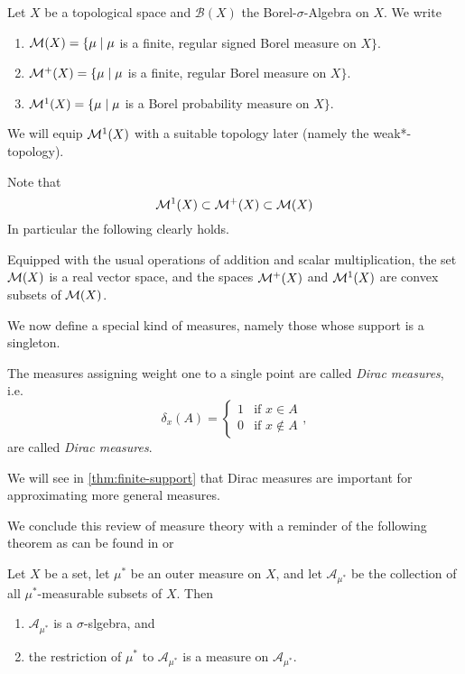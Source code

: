 \begin{notation}
	Let $X$ be a topological space and $\mathcal{B}(X)$ the Borel-$\sigma$-Algebra on $X$. We write
	\begin{enumerate}
	\item	$\mathcal{M}(X)=\{\mu\mid \mu$ is a finite, regular signed Borel measure on $X\}$.
	\item $\mathcal{M}^+(X)=\{\mu\mid \mu$ is a finite, regular Borel measure on $X\}$.
	\item $\mathcal{M}^1(X)=\{\mu\mid\mu$ is a Borel probability measure on $X \}$.
	\end{enumerate}
\end{notation}

We will equip $\mathcal{M}^1(X)$ with a suitable topology later (namely the weak*-topology).

Note that
\[
\mathcal{M}^1(X)\subset \mathcal{M}^+(X)\subset \mathcal{M}(X)
\]
In particular the following clearly holds.

\begin{lemma}
	Equipped with the usual operations of addition and scalar multiplication, the set $\mathcal{M}(X)$ is a real vector space, and the spaces $\mathcal{M}^+(X)$ and $\mathcal{M}^1(X)$ are convex subsets of $\mathcal{M}(X)$.
\end{lemma}

We now define a special kind of measures, namely those whose support is a singleton. 
\begin{definition}
	The measures assigning weight one to a single point are called \emph{Dirac measures}, i.e.
	\[
	\delta_x(A)=\begin{cases}
	1&\text{if }x\in A\\
	0&\text{if }x\not\in A
	\end{cases},
	\] 
	are called \emph{Dirac measures}.
\end{definition}
We will see in \autoref{thm:finite-support} that Dirac measures are important for approximating more general measures.

We conclude this review of measure theory with a reminder of the following theorem as can be found in \cite[Theorem 4.11, 4.13]{friedl:ana-3} or \cite[S.18]{cohn}
\begin{theorem}\label{thm:measure-extension}
	Let $X$ be a set, let $\mu^\ast$ be an outer measure on $X$, and let $\mathcal{A}_{\mu^\ast}$ be the collection of all $\mu^\ast$-measurable subsets of $X$. Then
	\begin{enumerate}
		\item $\mathcal{A}_{\mu^\ast}$ is a $\sigma$-slgebra, and
		\item the restriction of $\mu^\ast$ to $\mathcal{A}_{\mu^\ast}$ is a measure on $\mathcal{A}_{\mu^\ast}$.
	\end{enumerate}	
\end{theorem}

